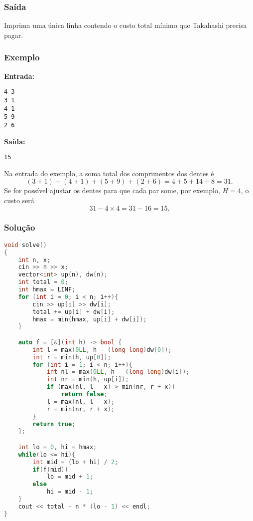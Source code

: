 \subsubsection*{Saída}
Imprima uma única linha contendo o custo total mínimo que Takahashi precisa pagar.

\subsubsection*{Exemplo}
\textbf{Entrada:}
\begin{verbatim}
4 3
3 1
4 1
5 9
2 6
\end{verbatim}
\textbf{Saída:}
\begin{verbatim}
15
\end{verbatim}

Na entrada do exemplo, a soma total dos comprimentos dos dentes é
\[
(3+1)+(4+1)+(5+9)+(2+6)=4+5+14+8=31.
\]
Se for possível ajustar os dentes para que cada par some, por exemplo, \(H=4\), o custo será
\[
31 - 4\times4 = 31-16 = 15.
\]

\subsubsection*{Solução}
\begin{lstlisting}[language=C++]
void solve()
{
    int n, x; 
    cin >> n >> x;
    vector<int> up(n), dw(n);
    int total = 0;
    int hmax = LINF;
    for (int i = 0; i < n; i++){
        cin >> up[i] >> dw[i];
        total += up[i] + dw[i];
        hmax = min(hmax, up[i] + dw[i]);
    }

    auto f = [&](int h) -> bool {
        int l = max(0LL, h - (long long)dw[0]);
        int r = min(h, up[0]);
        for (int i = 1; i < n; i++){
            int nl = max(0LL, h - (long long)dw[i]);
            int nr = min(h, up[i]);
            if (max(nl, l - x) > min(nr, r + x))
                return false;
            l = max(nl, l - x);
            r = min(nr, r + x);
        }
        return true;
    };

    int lo = 0, hi = hmax;
    while(lo <= hi){
        int mid = (lo + hi) / 2;
        if(f(mid))
            lo = mid + 1;
        else
            hi = mid - 1;
    }
    cout << total - n * (lo - 1) << endl;
}
\end{lstlisting}
